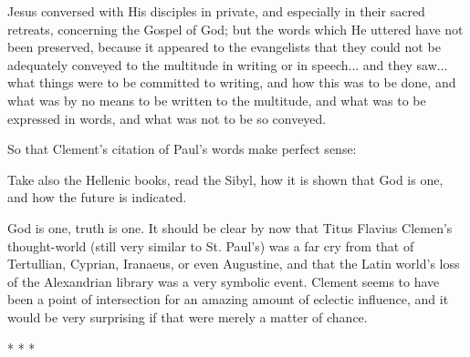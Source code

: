 \begin{quotex}
Jesus conversed with His disciples in private, and especially in their sacred retreats, concerning the Gospel of God; but the words which He uttered have not been preserved, because it appeared to the evangelists that they could not be adequately conveyed to the multitude in writing or in speech... and they saw... what things were to be committed to writing, and how this was to be done, and what was by no means to be written to the multitude, and what was to be expressed in words, and what was not to be so conveyed. 
\end{quotex}


So that Clement's citation of Paul's words make perfect sense:

\begin{quotex}
Take also the Hellenic books, read the Sibyl, how it is shown that God is one, and how the future is indicated. 
\end{quotex}


God is one, truth is one. It should be clear by now that Titus Flavius Clemen's thought-world (still very similar to St. Paul's) was a far cry from that of Tertullian, Cyprian, Iranaeus, or even Augustine, and that the Latin world's loss of the Alexandrian library was a very symbolic event. Clement seems to have been a point of intersection for an amazing amount of eclectic influence, and it would be very surprising if that were merely a matter of chance.



\begin{center}* * *\end{center}


